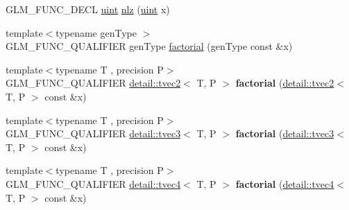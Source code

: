 \begin{DoxyCompactItemize}
\item 
G\+L\+M\+\_\+\+F\+U\+N\+C\+\_\+\+D\+E\+CL \hyperlink{group__core__precision_ga4fd29415871152bfb5abd588334147c8}{uint} \hyperlink{group__gtx__integer_gacbe62fd2384464c16ea30ecc4defc11c}{nlz} (\hyperlink{group__core__precision_ga4fd29415871152bfb5abd588334147c8}{uint} x)
\item 
{\footnotesize template$<$typename gen\+Type $>$ }\\G\+L\+M\+\_\+\+F\+U\+N\+C\+\_\+\+Q\+U\+A\+L\+I\+F\+I\+ER gen\+Type \hyperlink{group__gtx__integer_ga8cbd3120905f398ec321b5d1836e08fb}{factorial} (gen\+Type const \&x)
\item 
{\footnotesize template$<$typename T , precision P$>$ }\\G\+L\+M\+\_\+\+F\+U\+N\+C\+\_\+\+Q\+U\+A\+L\+I\+F\+I\+ER \hyperlink{structglm_1_1detail_1_1tvec2}{detail\+::tvec2}$<$ T, P $>$ {\bfseries factorial} (\hyperlink{structglm_1_1detail_1_1tvec2}{detail\+::tvec2}$<$ T, P $>$ const \&x)\hypertarget{namespaceglm_a994e144c2b5dc27b1925f4cc615881cd}{}\label{namespaceglm_a994e144c2b5dc27b1925f4cc615881cd}

\item 
{\footnotesize template$<$typename T , precision P$>$ }\\G\+L\+M\+\_\+\+F\+U\+N\+C\+\_\+\+Q\+U\+A\+L\+I\+F\+I\+ER \hyperlink{structglm_1_1detail_1_1tvec3}{detail\+::tvec3}$<$ T, P $>$ {\bfseries factorial} (\hyperlink{structglm_1_1detail_1_1tvec3}{detail\+::tvec3}$<$ T, P $>$ const \&x)\hypertarget{namespaceglm_a711b1e0a9becb300d38fcbe681bf5044}{}\label{namespaceglm_a711b1e0a9becb300d38fcbe681bf5044}

\item 
{\footnotesize template$<$typename T , precision P$>$ }\\G\+L\+M\+\_\+\+F\+U\+N\+C\+\_\+\+Q\+U\+A\+L\+I\+F\+I\+ER \hyperlink{structglm_1_1detail_1_1tvec4}{detail\+::tvec4}$<$ T, P $>$ {\bfseries factorial} (\hyperlink{structglm_1_1detail_1_1tvec4}{detail\+::tvec4}$<$ T, P $>$ const \&x)\hypertarget{namespaceglm_a2f731382ce9ba7fb318d3a41ce25b84a}{}\label{namespaceglm_a2f731382ce9ba7fb318d3a41ce25b84a}


\end{DoxyCompactItemize}

